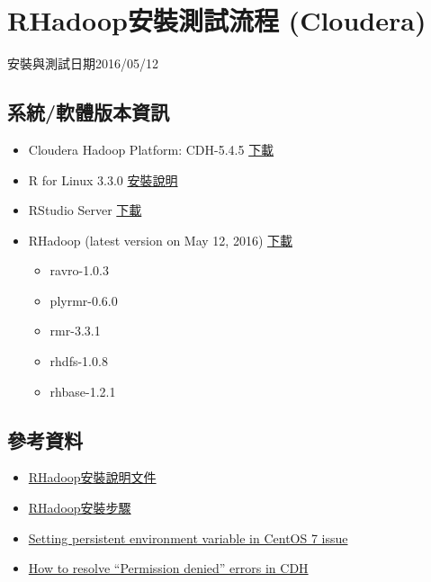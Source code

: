 \documentclass[]{book}
\providecommand{\tightlist}{%
  \setlength{\itemsep}{0pt}\setlength{\parskip}{0pt}}
\theoremstyle{definition}
\theoremstyle{definition}
\theoremstyle{remark}
\begin{document}
\section{RHadoop安裝測試流程 (Cloudera)}\label{rhadoop-cloudera}

安裝與測試日期2016/05/12

\subsection{系統/軟體版本資訊}

\begin{itemize}
\tightlist
\item
  Cloudera Hadoop Platform: CDH-5.4.5
  \href{http://www.cloudera.com/downloads/cdh/5-4-5.html}{下載}
\item
  R for Linux 3.3.0
  \href{https://cran.rstudio.com/bin/linux/redhat/README}{安裝說明}
\item
  RStudio Server
  \href{https://www.rstudio.com/products/rstudio/download-server/}{下載}
\item
  RHadoop (latest version on May 12, 2016)
  \href{https://github.com/RevolutionAnalytics/RHadoop/wiki/Downloads}{下載}

  \begin{itemize}
  \tightlist
  \item
    ravro-1.0.3
  \item
    plyrmr-0.6.0
  \item
    rmr-3.3.1
  \item
    rhdfs-1.0.8
  \item
    rhbase-1.2.1
  \end{itemize}
\end{itemize}

\subsection{參考資料}\label{-1}

\begin{itemize}
\tightlist
\item
  \href{https://github.com/RevolutionAnalytics/RHadoop/wiki/Installing-RHadoop-on-RHEL}{RHadoop安裝說明文件}
\item
  \href{https://bigdatastudy.hackpad.com/ep/pad/static/IADMBeqF0vV}{RHadoop安裝步驟}
\item
  \href{http://unix.stackexchange.com/questions/271514/setting-persistent-environment-variable-in-centos-7-issue}{Setting
  persistent environment variable in CentOS 7 issue}
\item
  \href{https://community.cloudera.com/t5/CDH-Manual-Installation/How-to-resolve-quot-Permission-denied-quot-errors-in-CDH/ta-p/36141}{How
  to resolve ``Permission denied'' errors in CDH}
\end{itemize}
\end{document}

